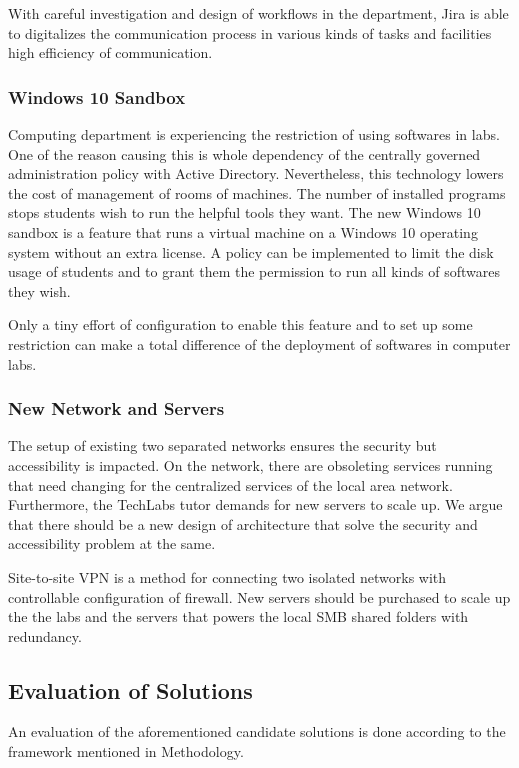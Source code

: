 With careful investigation and design of workflows in the department, Jira is able to digitalizes the communication process in various kinds of tasks and facilities high efficiency of communication.

\subsubsection{Windows 10 Sandbox}
Computing department is experiencing the restriction of using softwares in labs. One of the reason causing this is whole dependency of the centrally governed administration policy with Active Directory. Nevertheless, this technology lowers the cost of management of rooms of machines. The number of installed programs stops students wish to run the helpful tools they want. The new Windows 10 sandbox is a feature that runs a virtual machine on a Windows 10 operating system without an extra license. A policy can be implemented to limit the disk usage of students and to grant them the permission to run all kinds of softwares they wish.

Only a tiny effort of configuration to enable this feature and to set up some restriction can make a total difference of the deployment of softwares in computer labs.

\subsubsection{New Network and Servers}
The setup of existing two separated networks ensures the security but accessibility is impacted. On the network, there are obsoleting services running that need changing for the centralized services of the local area network. Furthermore, the TechLabs tutor demands for new servers to scale up. We argue that there should be a new design of architecture that solve the security and accessibility problem at the same.

Site-to-site VPN is a method for connecting two isolated networks with controllable configuration of firewall. New servers should be purchased to scale up the the labs and the servers that powers the local SMB shared folders with redundancy.

\subsection{Evaluation of Solutions}
An evaluation of the aforementioned candidate solutions is done according to the framework mentioned in Methodology.

